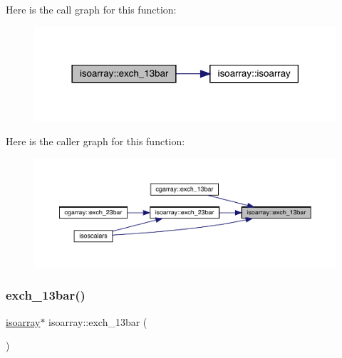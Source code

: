 Here is the call graph for this function\+:
\nopagebreak
\begin{figure}[H]
\begin{center}
\leavevmode
\includegraphics[width=318pt]{d5/dd9/classisoarray_ac9b13ab94dad05014c087cc89776eeff_cgraph}
\end{center}
\end{figure}
Here is the caller graph for this function\+:
\nopagebreak
\begin{figure}[H]
\begin{center}
\leavevmode
\includegraphics[width=350pt]{d5/dd9/classisoarray_ac9b13ab94dad05014c087cc89776eeff_icgraph}
\end{center}
\end{figure}
\mbox{\label{classisoarray_a0fd60ac09d139d86f9cf8fa18fa5577d}} 
\subsubsection{\texorpdfstring{exch\_13bar()}{exch\_13bar()}\hspace{0.1cm}{\footnotesize\ttfamily [2/3]}}
{\footnotesize\ttfamily \mbox{\hyperlink{classisoarray}{isoarray}}$\ast$ isoarray\+::exch\+\_\+13bar (\begin{DoxyParamCaption}{ }\end{DoxyParamCaption})}

\mbox{\label{classisoarray_a0fd60ac09d139d86f9cf8fa18fa5577d}} 
